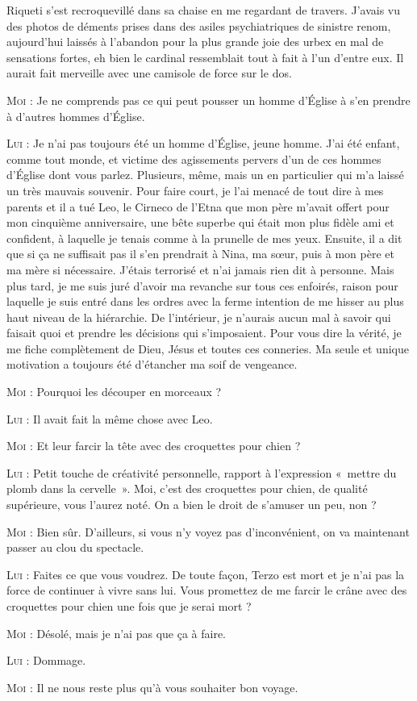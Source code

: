 Riqueti s’est recroquevillé dans sa chaise en me regardant de travers. J’avais vu des photos de déments prises dans des asiles psychiatriques de sinistre renom, aujourd’hui laissés à l’abandon pour la plus grande joie des urbex en mal de sensations fortes, eh bien le cardinal ressemblait tout à fait à l’un d’entre eux. Il aurait fait merveille avec une camisole de force sur le dos.

\begin{dialogue}

\textsc{Moi} : Je ne comprends pas ce qui peut pousser un homme d’Église à s’en prendre à d’autres hommes d’Église.

\textsc{Lui} : Je n’ai pas toujours été un homme d’Église, jeune homme. J’ai été enfant, comme tout monde, et victime des agissements pervers d’un de ces hommes d’Église dont vous parlez. Plusieurs, même, mais un en particulier qui m’a laissé un très mauvais souvenir. Pour faire court, je l’ai menacé de tout dire à mes parents et il a tué Leo, le Cirneco de l’Etna que mon père m’avait offert pour mon cinquième anniversaire, une bête superbe qui était mon plus fidèle ami et confident, à laquelle je tenais comme à la prunelle de mes yeux. Ensuite, il a dit que si ça ne suffisait pas il s’en prendrait à Nina, ma sœur, puis à mon père et ma mère si nécessaire. J’étais terrorisé et n’ai jamais rien dit à personne. Mais plus tard, je me suis juré d’avoir ma revanche sur tous ces enfoirés, raison pour laquelle je suis entré dans les ordres avec la ferme intention de me hisser au plus haut niveau de la hiérarchie. De l’intérieur, je n’aurais aucun mal à savoir qui faisait quoi et prendre les décisions qui s’imposaient. Pour vous dire la vérité, je me fiche complètement de Dieu, Jésus et toutes ces conneries. Ma seule et unique motivation a toujours été d’étancher ma soif de vengeance.

\textsc{Moi} : Pourquoi les découper en morceaux ?

\textsc{Lui} : Il avait fait la même chose avec Leo.

\textsc{Moi} : Et leur farcir la tête avec des croquettes pour chien ?

\textsc{Lui} : Petit touche de créativité personnelle, rapport à l’expression «~mettre du plomb dans la cervelle~». Moi, c’est des croquettes pour chien, de qualité supérieure, vous l’aurez noté. On a bien le droit de s’amuser un peu, non ?

\textsc{Moi} : Bien sûr. D’ailleurs, si vous n’y voyez pas d’inconvénient, on va maintenant passer au clou du spectacle.

\textsc{Lui} : Faites ce que vous voudrez. De toute façon, Terzo est mort et je n’ai pas la force de continuer à vivre sans lui. Vous promettez de me farcir le crâne avec des croquettes pour chien une fois que je serai mort ?

\textsc{Moi} : Désolé, mais je n’ai pas que ça à faire.

\textsc{Lui} : Dommage.

\textsc{Moi} : Il ne nous reste plus qu’à vous souhaiter bon voyage.

\end{dialogue}

